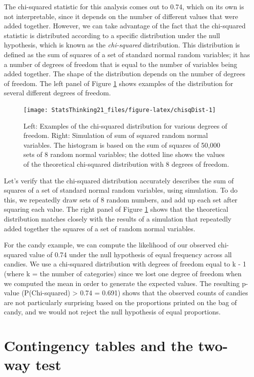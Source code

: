 \documentclass[12pt,]{book}
\theoremstyle{definition}
\theoremstyle{definition}
\theoremstyle{definition}
\theoremstyle{remark}
\begin{document}
The chi-squared statistic for this analysis comes out to 0.74, which on its own is not interpretable, since it depends on the number of different values that were added together. However, we can take advantage of the fact that the chi-squared statistic is distributed according to a specific distribution under the null hypothesis, which is known as the \emph{chi-squared} distribution. This distribution is defined as the sum of squares of a set of standard normal random variables; it has a number of degrees of freedom that is equal to the number of variables being added together. The shape of the distribution depends on the number of degrees of freedom. The left panel of Figure \ref{fig:chisqDist} shows examples of the distribution for several different degrees of freedom.

\begin{figure}
\texttt{[image: StatsThinking21\_files/figure-latex/chisqDist-1]} \caption{Left: Examples of the chi-squared distribution for various degrees of freedom.  Right: Simulation of sum of squared random normal variables.   The histogram is based on the sum of squares of 50,000 sets of 8 random normal variables; the dotted line shows the values of the theoretical chi-squared distribution with 8 degrees of freedom.}\label{fig:chisqDist}
\end{figure}

Let's verify that the chi-squared distribution accurately describes the sum of squares of a set of standard normal random variables, using simulation. To do this, we repeatedly draw sets of 8 random numbers, and add up each set after squaring each value. The right panel of Figure \ref{fig:chisqDist} shows that the theoretical distribution matches closely with the results of a simulation that repeatedly added together the squares of a set of random normal variables.

For the candy example, we can compute the likelihood of our observed chi-squared value of 0.74 under the null hypothesis of equal frequency across all candies. We use a chi-squared distribution with degrees of freedom equal to k - 1 (where k = the number of categories) since we lost one degree of freedom when we computed the mean in order to generate the expected values. The resulting p-value (P(Chi-squared) \textgreater{} 0.74 = 0.691) shows that the observed counts of candies are not particularly surprising based on the proportions printed on the bag of candy, and we would not reject the null hypothesis of equal proportions.

\hypertarget{two-way-test}{%
\section{Contingency tables and the two-way test}\label{two-way-test}}
\end{document}
